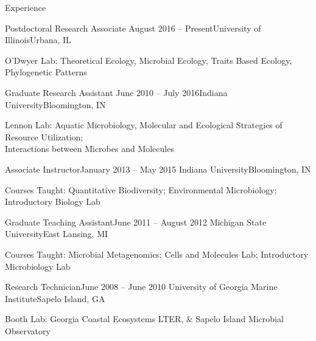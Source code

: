 \documentclass{resume} %
\begin{document}
\begin{rSection}{Experience}

    \begin{rSubsection}{Postdoctoral Research Associate}
      {August 2016 -- Present}{University of Illinois}{Urbana, IL}
      \item O'Dwyer Lab: Theoretical Ecology, Microbial Ecology, Traits Based Ecology, Phylogenetic Patterns
    \end{rSubsection}

  \begin{rSubsection}{Graduate Research Assistant}
    {June 2010 -- July 2016}{Indiana University}{Bloomington, IN}
    \item Lennon Lab: Aquatic Microbiology, Molecular and Ecological Strategies
                      of Resource Utilization; \\
                      Interactions between Microbes and Molecules
  \end{rSubsection}

  \begin{rSubsection}{Associate Instructor}{January 2013 -- May 2015}
    {Indiana University}{Bloomington, IN}
    \item Courses Taught: Quantitative Biodiversity; Environmental Microbiology;
                          Introductory Biology Lab
  \end{rSubsection}

  \begin{rSubsection}{Graduate Teaching Assistant}{June 2011 -- August 2012}
    {Michigan State University}{East Lansing, MI}
    \item Courses Taught: Microbial Metagenomics; Cells and Molecules Lab;
                          Introductory Microbiology Lab
  \end{rSubsection}

  \begin{rSubsection}{Research Technician}{June 2008 -- June 2010}
    {University of Georgia Marine Institute}{Sapelo Island, GA}
    \item Booth Lab: Georgia Coastal Ecosystems LTER, \& Sapelo Island Microbial
                     Observatory
  \end{rSubsection}


\end{rSection}
\end{document}
